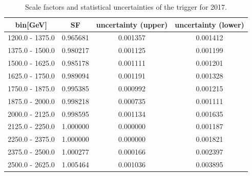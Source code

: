 \begin{table}
	\centering
	\caption{Scale factors and statistical uncertainties of the \HT trigger for 2017.}
	\label{tab:2017_triggerSF}
	\begin{tabular}{cccc}
		\hline
		\HT bin[GeV]    & SF       & uncertainty (upper) & uncertainty (lower) \\
		\hline
		1200.0 - 1375.0 & 0.965681 & 0.001357            & 0.001412            \\
		1375.0 - 1500.0 & 0.980217 & 0.001125            & 0.001199            \\
		1500.0 - 1625.0 & 0.985178 & 0.001111            & 0.001201            \\
		1625.0 - 1750.0 & 0.989094 & 0.001191            & 0.001328            \\
		1750.0 - 1875.0 & 0.995385 & 0.000992            & 0.001215            \\
		1875.0 - 2000.0 & 0.998218 & 0.000735            & 0.001111            \\
		2000.0 - 2125.0 & 0.998595 & 0.001134            & 0.001635            \\
		2125.0 - 2250.0 & 1.000000 & 0.000000            & 0.001187            \\
		2250.0 - 2375.0 & 1.000000 & 0.000000            & 0.001821            \\
		2375.0 - 2500.0 & 1.000277 & 0.000166            & 0.002397            \\
		2500.0 - 2625.0 & 1.005464 & 0.001036            & 0.003895            \\
		\hline
	\end{tabular}
\end{table}

